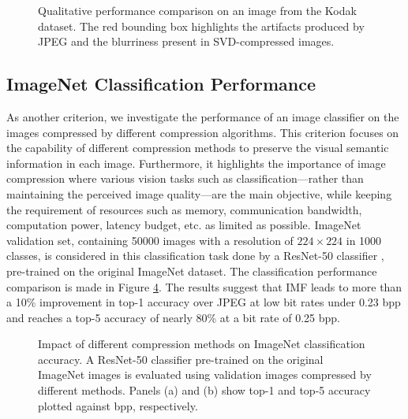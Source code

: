 \begin{figure}[t]
	\caption{Qualitative performance comparison on an image from the Kodak dataset. The red bounding box highlights the artifacts produced by JPEG and the blurriness present in SVD-compressed images.}
	\label{fig: qualitative comparison}
\end{figure}


\subsection{ImageNet Classification Performance} \label{sec: imagenet Classification Performance}

As another criterion, we investigate the performance of an image classifier on the images compressed by different compression algorithms. This criterion focuses on the capability of different compression methods to preserve the visual semantic information in each image. Furthermore, it highlights the importance of image compression where various vision tasks such as classification---rather than maintaining the perceived image quality---are the main objective, while keeping the requirement of resources such as memory, communication bandwidth, computation power, latency budget, etc. as limited as possible. ImageNet \cite{deng2009imagenet} validation set, containing 50000 images with a resolution of $224 \times 224$ in 1000 classes, is considered in this classification task done by a ResNet-50 classifier \cite{he2016deep}, pre-trained on the original ImageNet dataset. The classification performance comparison is made in Figure \ref{fig: imagenet_classification}. The results suggest that IMF leads to more than a 10\% improvement in top-1 accuracy over JPEG at low bit rates under 0.23 bpp and reaches a top-5 accuracy of nearly 80\% at a bit rate of 0.25 bpp.

\begin{figure}[t]
	\centering
	\begin{subfigure}{.5\textwidth}
		\centering
		\resizebox{.95\textwidth}{!}{}
		\caption{}
		\label{fig: top1-vs-bpp imagenet}
	\end{subfigure}%
	\begin{subfigure}{.5\textwidth}
		\centering
		\resizebox{.95\textwidth}{!}{}
		\caption{}
		\label{fig: top5-vs-bpp imagenet}
	\end{subfigure}
	\caption{Impact of different compression methods on ImageNet classification accuracy. A ResNet-50 classifier pre-trained on the original ImageNet images is evaluated using validation images compressed by different methods. Panels (a) and (b) show top-1 and top-5 accuracy plotted against bpp, respectively. }
	\label{fig: imagenet_classification}
\end{figure}



